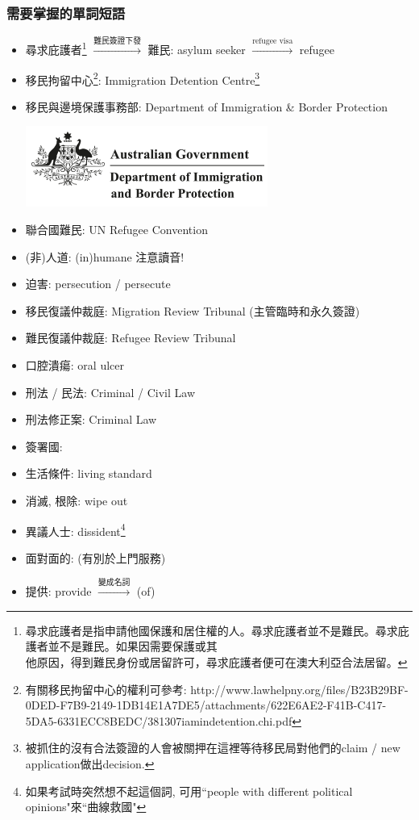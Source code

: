 \subsubsection*{需要掌握的單詞短語}
\begin{multicols}{2}
\begin{itemize}
  \itemsep0em
  \item 尋求庇護者\footnote{尋求庇護者是指申請他國保護和居住權的人。尋求庇護者並不是難民。尋求庇護者並不是難民。如果因需要保護或其\\他原因，得到難民身份或居留許可，尋求庇護者便可在澳大利亞合法居留。} $\xrightarrow{\text{難民簽證下發}}$ 難民: asylum seeker $\xrightarrow{\text{refugee visa}}$ refugee
  \item 移民拘留中心\footnote{有關移民拘留中心的權利可參考: http://www.lawhelpny.org/files/B23B29BF-0DED-F7B9-2149-1DB14E1A7DE5/attachments/622E6AE2-F41B-C417-5DA5-6331ECC8BEDC/381307iamindetention.chi.pdf}: Immigration Detention Centre\footnote{被抓住的沒有合法簽證的人會被關押在這裡等待移民局對他們的claim / new application做出decision.}
  \item 移民與邊境保護事務部: Department of Immigration \& Border Protection
  \begin{center}
    \includegraphics[scale=.6]{pics/dibp-logo}
  \end{center}
  \item 聯合國難民: UN Refugee Convention
  \item (非)人道: (in)humane 注意讀音!
  \item 迫害: persecution / persecute
  \item 移民復議仲裁庭: Migration Review Tribunal (主管臨時和永久簽證)
  \item 難民復議仲裁庭: Refugee Review Tribunal
  \item 口腔潰瘍: oral ulcer
  \item 刑法 / 民法: Criminal / Civil Law
  \item 刑法修正案: Criminal Law 
  \item 簽署國: 
  \item 生活條件: living standard
  \item 消滅, 根除: wipe out
  \item 異議人士: dissident\footnote{如果考試時突然想不起這個詞, 可用``people with different political opinions"來``曲線救國"}
  \item 面對面的:  (有別於上門服務)
  \item 提供: provide $\xrightarrow{\text{變成名詞}}$  (of)
\end{itemize}
\end{multicols}

